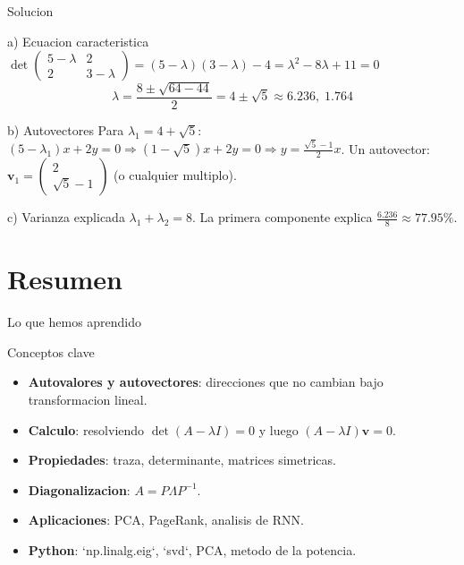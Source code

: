 \documentclass[aspectratio=169, 10pt, xcolor=table]{beamer}
\begin{document}
\begin{frame}{Solucion}
    \begin{block}{a) Ecuacion caracteristica}
        $\det\begin{pmatrix}5-\lambda&2\\2&3-\lambda\end{pmatrix} = (5-\lambda)(3-\lambda)-4 = \lambda^2-8\lambda+11=0$
        \[
        \lambda = \frac{8\pm\sqrt{64-44}}{2} = 4\pm\sqrt{5} \approx 6.236,\; 1.764
        \]
    \end{block}
    \begin{block}{b) Autovectores}
        Para $\lambda_1=4+\sqrt{5}$: $(5-\lambda_1)x+2y=0 \Rightarrow (1-\sqrt{5})x+2y=0 \Rightarrow y=\frac{\sqrt{5}-1}{2}x$.
        Un autovector: $\mathbf{v}_1 = \begin{pmatrix}2\\ \sqrt{5}-1\end{pmatrix}$ (o cualquier multiplo).
    \end{block}
    \begin{block}{c) Varianza explicada}
        $\lambda_1+\lambda_2=8$. La primera componente explica $\frac{6.236}{8}\approx 77.95\%$.
    \end{block}
\end{frame}

\section{Resumen}

\begin{frame}{Lo que hemos aprendido}
    \begin{exampleblock}{Conceptos clave}
        \begin{itemize}
            \item \textbf{Autovalores y autovectores}: direcciones que no cambian bajo transformacion lineal.
            \item \textbf{Calculo}: resolviendo $\det(A-\lambda I)=0$ y luego $(A-\lambda I)\mathbf{v}=0$.
            \item \textbf{Propiedades}: traza, determinante, matrices simetricas.
            \item \textbf{Diagonalizacion}: $A = P\Lambda P^{-1}$.
            \item \textbf{Aplicaciones}: PCA, PageRank, analisis de RNN.
            \item \textbf{Python}: `np.linalg.eig`, `svd`, PCA, metodo de la potencia.
        \end{itemize}
    \end{exampleblock}
\end{frame}
\end{document}
